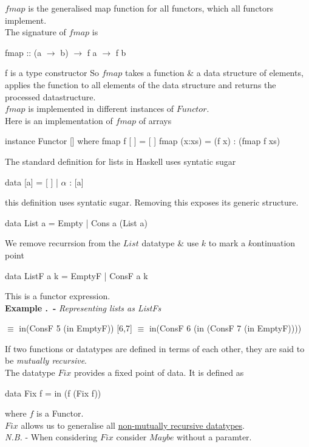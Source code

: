 \documentclass[11pt,a4paper]{article}
\begin{document}
$fmap$ is the generalised map function for all functors, which all functors implement.\\
The signature of $fmap$ is
\begin{code}
fmap :: (a $\to$ b) $\to$ f a $\to$ f b
\end{code}
f is a type constructor
So $fmap$ takes a function \& a data structure of elements, applies the function to all elements of the data structure and returns the processed datastructure.\\

$fmap$ is implemented in different instances of $Functor$.\\
Here is an implementation of $fmap$ of arrays
\begin{code}
instance Functor [] where
  fmap f [ ]  = [ ]
  fmap (x:xs) = (f x) : (fmap f xs)
\end{code}

The standard definition for lists in Haskell uses syntatic sugar
\begin{code}
data [a] = [ ]
         | $\alpha$ : [a]
\end{code}

this definition uses syntatic sugar. Removing this exposes its generic structure.
\begin{code}
data List a = Empty
            | Cons a (List a)
\end{code}

We remove recurrsion from the $List$ datatype \& use $k$ to mark a $k$ontinuation point
\begin{code}
data ListF a k = EmptyF
               | ConsF a k
\end{code}
This is a functor expression.\\

 \textbf{Example .\ - }\textit{Representing lists as ListFs}
\begin{code}
[5]   $\equiv$ in(ConsF 5 (in EmptyF))
[6,7] $\equiv$ in(ConsF 6 (in (ConsF 7 (in EmptyF))))
\end{code}

If two functions or datatypes are defined in terms of each other, they are said to be \textit{mutually recursive}.\\

The datatype $Fix$ provides a fixed point of data. It is defined as
\begin{code}
data Fix f = in (f (Fix f))
\end{code}
where $f$ is a Functor.\\
$Fix$ allows us to generalise all \underline{non-mutually recursive datatypes}.\\
\textit{N.B.} - When considering $Fix$ consider $Maybe$ without a paramter.\\
\end{document}
